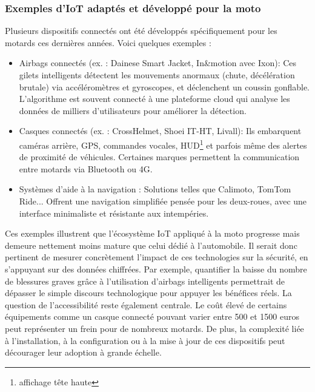 \subsubsection{Exemples d’IoT adaptés et développé pour la moto}
Plusieurs dispositifs connectés ont été développés spécifiquement pour les motards ces dernières années. Voici quelques exemples :
\begin{itemize}
  \item Airbags connectés (ex. : Dainese Smart Jacket, In\&motion avec Ixon): Ces gilets intelligents détectent les mouvements anormaux (chute, décélération brutale) via accéléromètres et gyroscopes, et déclenchent un coussin gonflable. L’algorithme est souvent connecté à une plateforme cloud qui analyse les données de milliers d’utilisateurs pour améliorer la détection.
  \item Casques connectés (ex. : CrossHelmet, Shoei IT-HT, Livall): Ils embarquent caméras arrière, GPS, commandes vocales, HUD\footnote{affichage tête haute} et parfois même des alertes de proximité de véhicules. Certaines marques permettent la communication entre motards via Bluetooth ou 4G.
  \item Systèmes d’aide à la navigation : Solutions telles que Calimoto, TomTom Ride... Offrent une navigation simplifiée pensée pour les deux-roues, avec une interface minimaliste et résistante aux intempéries.
\end{itemize}
Ces exemples illustrent que l’écosystème IoT appliqué à la moto progresse mais demeure nettement moins mature que celui dédié à l’automobile. Il serait donc pertinent de mesurer concrètement l’impact de ces technologies sur la sécurité, en s’appuyant sur des données chiffrées. Par exemple, quantifier la baisse du nombre de blessures graves grâce à l’utilisation d’airbags intelligents permettrait de dépasser le simple discours technologique pour appuyer les bénéfices réels.
La question de l’accessibilité reste également centrale. Le coût élevé de certains équipements comme un casque connecté pouvant varier entre 500 et 1500 euros peut représenter un frein pour de nombreux motards. De plus, la complexité liée à l’installation, à la configuration ou à la mise à jour de ces dispositifs peut décourager leur adoption à grande échelle.

